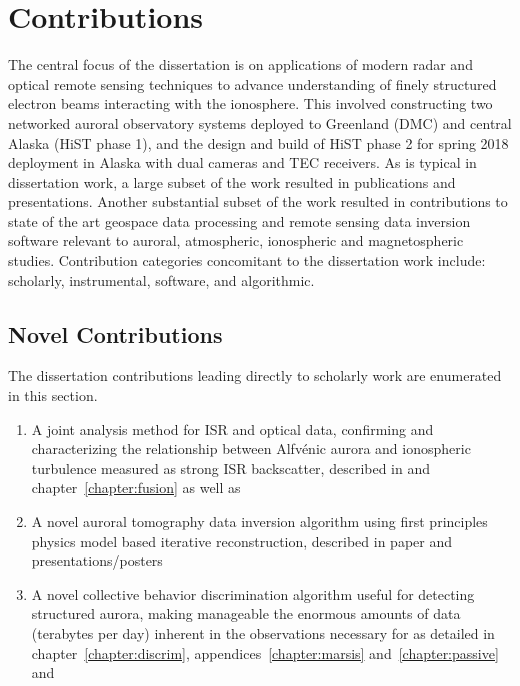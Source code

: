 \section{Contributions}\label{sec:contrib}
The central focus of the dissertation is on applications of modern radar and optical remote sensing techniques to advance understanding of finely structured electron beams interacting with the ionosphere.
This involved constructing two networked auroral observatory systems deployed to Greenland (DMC) and central Alaska (HiST phase 1), and the design and build of HiST phase 2 for spring 2018 deployment in Alaska with dual cameras and TEC receivers.
As is typical in dissertation work, a large subset of the work resulted in publications and presentations.
Another substantial subset of the work resulted in contributions to state of the art geospace data processing and remote sensing data inversion software relevant to auroral, atmospheric, ionospheric and magnetospheric studies.
Contribution categories concomitant to the dissertation work include: scholarly, instrumental, software, and algorithmic.

\subsection{Novel Contributions}
The dissertation contributions leading directly to scholarly work are enumerated in this section.
\begin{enumerate}
       
    \item A joint analysis method for ISR and optical data, confirming and characterizing the relationship between Alfvénic aurora and ionospheric turbulence measured as strong ISR backscatter, described in \citet{hirsch2017jgr} and chapter~\ref{chapter:fusion} as well as \citep{hirsch2016unh,hirsch2016precip,hirsch15agu} 
    
    \item A novel auroral tomography data inversion algorithm using first principles physics model based iterative reconstruction, described in paper \citet{hirsch2016} and presentations/posters \citet{hirsch2015cedarposter,hirsch2015mtssp,hirsch2014agu,hirsch2014cedar,hirsch2014cedartalk,hirsch2014ursi,hirsch2012}
    
    \item A novel collective behavior discrimination algorithm useful for detecting structured aurora, making manageable the enormous amounts of data (terabytes per day) inherent in the observations necessary for \citep{hirsch2017jgr,hirsch2016} as detailed in chapter~\ref{chapter:discrim}, appendices~\ref{chapter:marsis} and~\ref{chapter:passive} and \citep{swoboda2016python,hirsch2016bigdata,hirsch2015cedartalk}
\end{enumerate}


